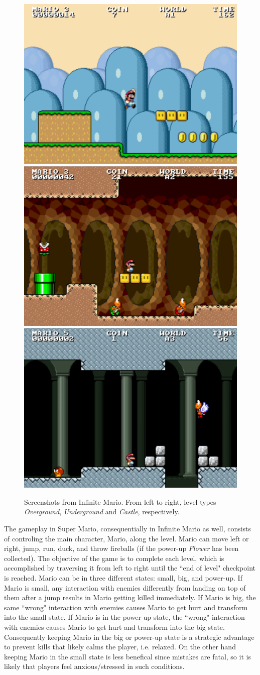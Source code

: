 \begin{figure}[h]
  \centering
  \includegraphics[width=.32\textwidth]{figures/mario-overground}\hfill
  \includegraphics[width=.32\textwidth]{figures/mario-underground}\hfill
  \includegraphics[width=.32\textwidth]{figures/mario-castle}
  \caption{Screenshots from Infinite Mario. From left to right, level types \textit{Overground}, \textit{Underground} and \textit{Castle}, respectively.}
  \label{fig:experiment2-infinite-mario}
\end{figure}

The gameplay in Super Mario, consequentially in Infinite Mario as well, consists of controling the main character, Mario, along the level. Mario can move left or right, jump, run, duck, and throw fireballs (if the power-up \textit{Flower} has been collected). The objective of the game is to complete each level, which is accomplished by traversing it from left to right until the ``end of level" checkpoint is reached. Mario can be in three different states: small, big, and power-up. If Mario is small, any interaction with enemies differently from landing on top of them after a jump results in Mario getting killed immediately. If Mario is big, the same ``wrong" interaction with enemies causes Mario to get hurt and transform into the small state. If Mario is in the power-up state, the ``wrong" interaction with enemies causes Mario to get hurt and transform into the big state. Consequently keeping Mario in the big or power-up state is a strategic advantage to prevent kills that likely calms the player, i.e. relaxed. On the other hand keeping Mario in the small state is less benefical since mistakes are fatal, so it is likely that players feel anxious/stressed in such conditions.

